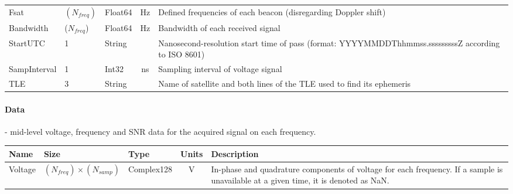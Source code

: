 \documentclass[12pt]{article}
\begin{document}
\begin{small}
\begin{scriptsize}
\begin{tabular}{|l|l|l|c|p{7cm}|}
Fsat & $(N_{freq})$ & Float64 & Hz & Defined frequencies of each beacon (disregarding Doppler shift)\\
Bandwidth & ($N_{freq}$) & Float64 & Hz & Bandwidth of each received signal\\
StartUTC & 1 & String & & Nanosecond-resolution start time of pass (format: \mbox{YYYYMMDDThhmmss.sssssssssZ} according to ISO 8601) \\
SampInterval & 1 & Int32 & ns & Sampling interval of voltage signal\\
TLE & 3 & String & & Name of satellite and both lines of the TLE used to find its ephemeris\\
\hline
\end{tabular}
\end{scriptsize}

\pagebreak
\paragraph{Data}- mid-level voltage, frequency and SNR data for the acquired signal on each frequency. \\
\begin{scriptsize}
\begin{tabular}{|l|l|l|c|p{7cm}|}
\hline
\textbf{Name} & \textbf{Size} & \textbf{Type} & \textbf{Units} & \textbf{Description} \\
\hline

Voltage & $(N_{freq}) \times (N_{samp})$ & Complex128 & V & In-phase and quadrature components of voltage for each frequency. If a sample is unavailable at a given time, it is denoted as NaN.\\
\hline
\end{tabular}
\end{scriptsize}


\end{small}
\end{document}
